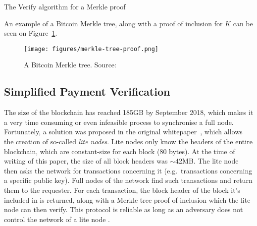 \begin{algorithm}[H]
  \caption{\label{alg:merkle-verification}The \textsf{Verify} algorithm
    for a Merkle proof}
    \begin{algorithmic}[1]
              \Else
              \EndIf
            \EndWhile
            \State{}
        \EndFunction
    \end{algorithmic}
\end{algorithm}

An example of a Bitcoin Merkle tree, along with a proof of inclusion for $K$ can be seen on Figure~\ref{fig:merkletree}. 

\begin{figure}
  \centering
  \texttt{[image: figures/merkle-tree-proof.png]}
  \caption{A Bitcoin Merkle tree. Source:~\cite{mastering}}
  \label{fig:merkletree}
\end{figure}

\subsection{Simplified Payment Verification}
The size of the  blockchain has reached 185GB by September 2018, which makes it a very time consuming or even infeasible process to synchronise a full node. Fortunately, a solution was proposed in the original whitepaper~\cite{bitcoin}, which allows the creation of so-called \textit{lite nodes}.  Lite nodes only know the headers of the entire blockchain, which are constant-size for each block (80 bytes). At the time of writing of this paper, the size of all block headers was $\sim$42MB. The lite node then asks the network for transactions concerning it (e.g.\ transactions concerning a specific public key). Full nodes of the network find such transactions and return them to the requester. For each transaction, the block header of the block it's included in is returned, along with a Merkle tree proof of inclusion which the lite node can then verify. This protocol is reliable  as long as an adversary does not control the network of a lite node .

